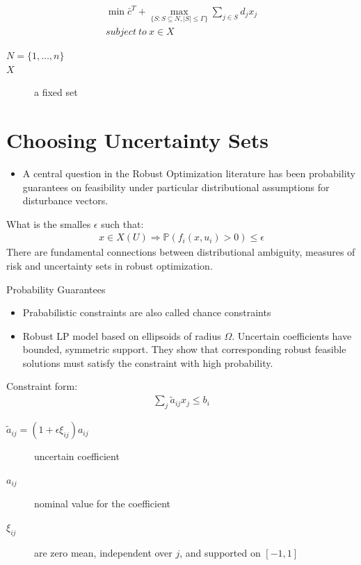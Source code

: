 \documentclass{beamer}
\begin{document}
\begin{frame}{}
\begin{align*}
\min \bar{c}^{T} + \max_{\{S : S \subseteq N, \lvert S \rvert \leq \Gamma \}} \sum_{j \in S}d_{j}x_{j} \\
subject~to~x \in X
\end{align*}
\begin{description}
\item [$N = \{1,\dots,n\}$]
\item [$X$] a fixed set
\end{description}
\end{frame}

\section{Choosing Uncertainty Sets}

\begin{frame}{}
\begin{itemize}
\item A central question in the Robust Optimization literature has been probability guarantees on feasibility under particular distributional assumptions for disturbance vectors.
\end{itemize}
What is the smalles $\epsilon$ such that:
\begin{align*}
x \in X(U) \Rightarrow \mathbb{P}(f_{i}(x, u_{i}) > 0) \leq \epsilon
\end{align*}
There are fundamental connections between distributional ambiguity, measures of risk and uncertainty sets in robust optimization.
\end{frame}

\begin{frame}{Probability Guarantees}
\begin{itemize}
\item Prababilistic constraints are also called chance constraints
\item Robust LP model based on ellipsoids of radius $\Omega$. Uncertain coefficients have bounded, symmetric support. They show that corresponding robust feasible solutions must satisfy the constraint with high probability.
\end{itemize}
Constraint form:
\begin{align*}
\sum_{j}\tilde{a}_{ij}x_{j} \leq b_{i}
\end{align*}
\begin{description}
\item [$\tilde{a}_{ij} = (1 + \epsilon \xi_{ij})a_{ij}$] uncertain coefficient
\item [$a_{ij}$] nominal value for the coefficient
\item [$\xi_{ij}$] are zero mean, independent over $j$, and supported on $[-1, 1]$
\end{description}
\end{frame}
\end{document}
